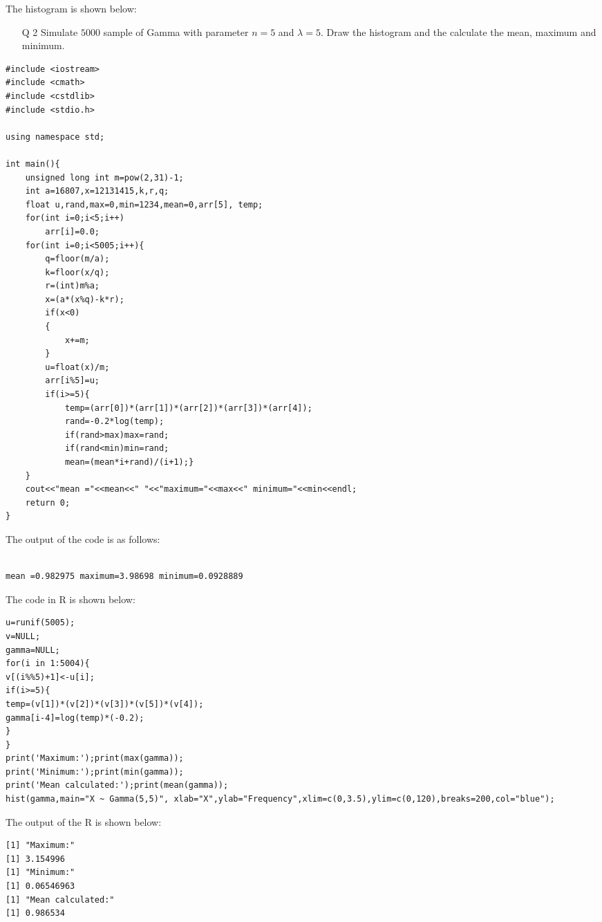 \documentclass[12pt]{book}
\begin{document}
The histogram is shown below:
\begin{figure}[H]
	\centering
\end{figure}
\newpage

\begin{enumerate}
\item[Q 2] Simulate $5000$ sample of Gamma with parameter $n=5$ and $\lambda=5$. Draw the histogram and the calculate the mean, maximum and minimum.
\end{enumerate}

\begin{lstlisting}
#include <iostream>
#include <cmath>
#include <cstdlib>
#include <stdio.h>

using namespace std;

int main(){
	unsigned long int m=pow(2,31)-1;
	int a=16807,x=12131415,k,r,q;
	float u,rand,max=0,min=1234,mean=0,arr[5], temp;
	for(int i=0;i<5;i++)
		arr[i]=0.0;
	for(int i=0;i<5005;i++){
		q=floor(m/a);
		k=floor(x/q);
		r=(int)m%a;
		x=(a*(x%q)-k*r);
		if(x<0)
		{
			x+=m;
		}
		u=float(x)/m;
		arr[i%5]=u;
		if(i>=5){
			temp=(arr[0])*(arr[1])*(arr[2])*(arr[3])*(arr[4]);
			rand=-0.2*log(temp);
			if(rand>max)max=rand;
			if(rand<min)min=rand;
			mean=(mean*i+rand)/(i+1);}
	}
	cout<<"mean ="<<mean<<" "<<"maximum="<<max<<" minimum="<<min<<endl;
	return 0;
}
\end{lstlisting}
The output of the code is as follows:\\\\
\begin{lstlisting}
mean =0.982975 maximum=3.98698 minimum=0.0928889
\end{lstlisting}
\newpage
The code in R is shown below:\\
\begin{lstlisting}
u=runif(5005);
v=NULL;
gamma=NULL;
for(i in 1:5004){
v[(i%%5)+1]<-u[i];
if(i>=5){
temp=(v[1])*(v[2])*(v[3])*(v[5])*(v[4]);
gamma[i-4]=log(temp)*(-0.2);
}
}
print('Maximum:');print(max(gamma));
print('Minimum:');print(min(gamma));
print('Mean calculated:');print(mean(gamma));
hist(gamma,main="X ~ Gamma(5,5)", xlab="X",ylab="Frequency",xlim=c(0,3.5),ylim=c(0,120),breaks=200,col="blue");
\end{lstlisting}
The output of the R is shown below:
\begin{lstlisting}
[1] "Maximum:"
[1] 3.154996
[1] "Minimum:"
[1] 0.06546963
[1] "Mean calculated:"
[1] 0.986534
\end{lstlisting}
\end{document}
